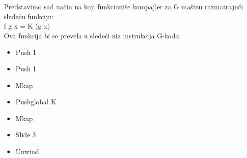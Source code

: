 \begin{primer}
Predstavimo sad način na koji funkcioniše kompajler za G mašinu razmatrajući sledeću funkciju:\\
f g x = K (g x)\\
Ova funkcija bi se prevela u sledeći niz instrukcija G-koda:
\begin{itemize}
\item Push 1
\item Push 1
\item Mkap
\item Pushglobal K
\item Mkap
\item Slide 3
\item Unwind
\end{itemize}
\end{primer}

